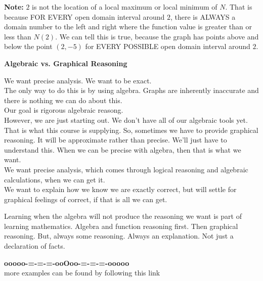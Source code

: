 \documentclass{ximera}
\begin{document}
\textbf{Note:} $2$ is not the location of a local maximum or local minimum of $N$.  That is because FOR EVERY open domain interval around $2$, there is ALWAYS a domain number to the left and right where the function value is greater than or less than $N(2)$.  We can tell this is true, because the graph has points above and below the point $(2, -5)$ for EVERY POSSIBLE open domain interval around $2$. \\













\begin{warning}  \textbf{\textcolor{blue!55!black}{Algebraic vs. Graphical Reasoning}}


We want precise analysis.  We want to be exact. \\


The only way to do this is by using algebra.  Graphs are inherently inaccurate and there is nothing we can do about this. \\


Our goal is rigorous algebraic reasong. \\



However, we are just starting out.  We don't have all of our algebraic tools yet.  That is what this course is supplying.  So, sometimes we have to provide graphical reasoning.  It will be approximate rather than precise.  We'll just have to understand this.  When we can be precise with algebra, then that is what we want. \\


We want precise analysis, which comes through logical reasoning and algebraic calculations, when we can get it. \\


We want to explain how we know we are exactly correct, but will settle for graphical feelings of correct, if that is all we can get. \\


\end{warning}



Learning when the algebra will not produce the reasoning we want is part of learning mathematics.  Algebra and function reasoning first. Then graphical reasoning.  But, always some reasoning.  Always an explanation. Not just a declaration of facts.








\begin{center}
\textbf{\textcolor{green!50!black}{ooooo-=-=-=-ooOoo-=-=-=-ooooo}} \\

more examples can be found by following this link\\ 

\end{center}
\end{document}

